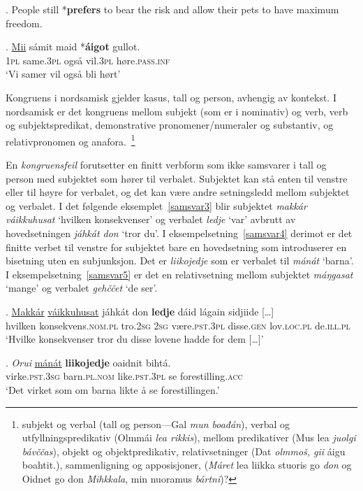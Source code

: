\documentclass{flammie}
\begin{document}
\ex. People still *\textbf{prefers} to bear the risk and allow their pets to have maximum freedom.\label{samsvar1}

\exg. \underline{Mii} sámit maid *\textbf{áigot} gullot.\label{samsvar2}\\
\textsc{1pl} same\textsc{.3pl} også vil\textsc{.3pl} høre\textsc{.pass.inf}\\
`Vi samer vil også bli hørt'

Kongruens i nordsamisk gjelder kasus, tall og person, avhengig av kontekst.  I
nordsamisk er det kongruens mellom subjekt (som er i nominativ) og verb, verb og
subjektspredikat, demonstrative pronomener/numeraler og substantiv, og
relativpronomen og anafora.~\cite[s.509ff.]{Nickel1994samisk}\footnote{subjekt
og verbal (tall og person---Gal \textit{mun boađán}), verbal og
utfyllningspredikativ (Olmmái \textit{lea rikkis}), mellom predikativer (Mus lea
\textit{juolgi bávččas}), objekt og objektpredikativ, relativsetninger (Dat
\textit{olmmoš, gii} áigu boahtit.), sammenligning og apposisjoner,
(\textit{Máret} lea liikka stuoris go \textit{don} og Oidnet go don
\textit{Mihkkala}, min nuoramus \textit{bártni})?}

En \textit{kongruensfeil} forutsetter en finitt verbform som ikke samsvarer i
tall og person med subjektet som hører til verbalet. Subjektet kan stå enten til
venstre eller til høyre for verbalet, og det kan være andre setningsledd mellom
subjektet og verbalet.  I det følgende eksemplet~\ref{samsvar3} blir subjektet
\textit{makkár váikkuhusat} `hvilken konsekvenser' og verbalet \textit{ledje}
`var' avbrutt av hovedsetningen \textit{jáhkát don} `tror du'. I
eksempelsetning~\ref{samsvar4} derimot er det finitte verbet til venstre for
subjektet bare en hovedsetning som introduserer en bisetning uten en
subjunksjon. Det er \textit{liikojedje} som er verbalet til \textit{mánát}
`barna'.  I eksempelsetning~\ref{samsvar5} er det en relativsetning mellom
subjektet \textit{máŋgasat} `mange' og verbalet \textit{gehččet} `de ser'.

\exg. \underline{Makkár} \underline{váikkuhusat} jáhkát don \textbf{ledje} dáid lágain sidjiide [\ldots]\label{samsvar3}\\
hvilken konsekvens\textsc{.nom.pl} tro\textsc{.2sg} \textsc{2sg} være\textsc{.pst.3pl} disse\textsc{.gen} lov\textsc{.loc.pl} de\textsc{.ill.pl}\\
`Hvilke konsekvenser tror du disse lovene hadde for dem [\ldots]'

\exg. \textit{Orui} \underline{mánát} \textbf{liikojedje} oaidnit bihtá.\label{samsvar4}\\
virke\textsc{.pst.3sg} barn\textsc{.pl.nom} like\textsc{.pst.3pl} se forestilling\textsc{.acc}\\
`Det virket som om barna likte å se forestillingen.'
\end{document}
